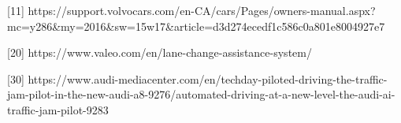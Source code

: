 [11] 
https://support.volvocars.com/en-CA/cars/Pages/owners-manual.aspx?mc=y286\&my=2016\&sw=15w17\&article=d3d274ecedf1c586c0a801e8004927e7

%
%
%
%
%
%
%

[20] https://www.valeo.com/en/lane-change-assistance-system/

%
%
%
%
%
%
%
%

[30] 
https://www.audi-mediacenter.com/en/techday-piloted-driving-the-traffic-jam-pilot-in-the-new-audi-a8-9276/automated-driving-at-a-new-level-the-audi-ai-traffic-jam-pilot-9283

